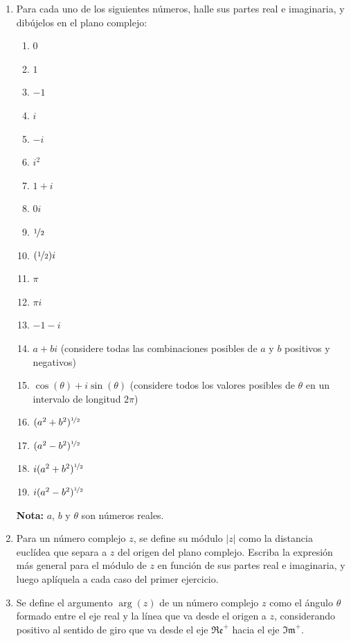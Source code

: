 \documentclass[11pt,spanish]{article}
\begin{document}
\begin{enumerate}


    \item Para cada uno de los siguientes números, halle sus partes real e imaginaria,
    y dibújelos en el plano complejo:

    \begin{enumerate}
        \item $0$
        \item $1$
        \item $-1$
        \item $i$
        \item $-i$
        \item $i^2$
        \item $1 + i$
        \item $0 i$
        \item $\nicefrac{1}{2}$
        \item $(\nicefrac{1}{2}) i$
        \item $\pi$
        \item $\pi i$
        \item $-1 - i$
        \item $a + bi$ (considere todas las combinaciones posibles de $a$ y $b$ positivos y negativos)
        \item $\cos(\theta) + i \sin(\theta)$ (considere todos los valores posibles de $\theta$ en un intervalo de longitud $2 \pi$)
        \item $(a^2 + b^2)^{\nicefrac{1}{2}}$
        \item $(a^2 - b^2)^{\nicefrac{1}{2}}$
        \item $i (a^2 + b^2)^{\nicefrac{1}{2}}$
        \item $i (a^2 - b^2)^{\nicefrac{1}{2}}$
    \end{enumerate}

    \textbf{Nota:} $a$, $b$ y $\theta$ son números reales.


    \item Para un número complejo $z$, se define su módulo $|z|$ como la distancia euclídea que separa a $z$ del origen del plano complejo. Escriba la expresión más general para el módulo de $z$ en función de sus partes real e imaginaria, y luego aplíquela a cada caso del primer ejercicio.


    \item Se define el argumento $\arg(z)$ de un número complejo $z$ como el ángulo $\theta$ formado entre el eje real y la línea que va desde el origen a $z$, considerando positivo al sentido de giro que va desde el eje $\mathfrak{Re}^+$ hacia el eje $\mathfrak{Im}^+$.


\end{enumerate}
\end{document}
